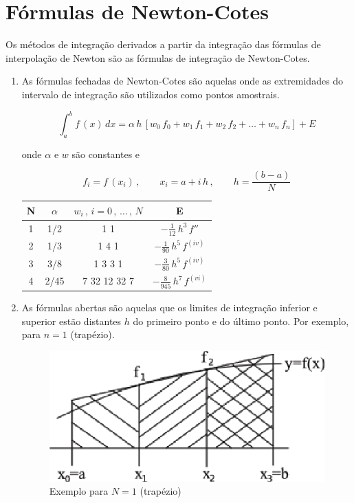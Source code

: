 \section{Fórmulas de Newton-Cotes}

Os métodos de integração derivados a partir da integração das fórmulas de interpolação de Newton são as fórmulas de integração de Newton-Cotes.

\begin{enumerate}
 \item

As fórmulas fechadas de Newton-Cotes são aquelas onde as extremidades do intervalo de integração são utilizados como pontos amostrais.

\[
 \int_a^b f\,(x) \, dx = \alpha \, h \, \left[ w_0\,f_0 + w_1\,f_1 + w_2\,f_2 + \ldots + w_n\,f_n \right] + E
\]

onde $\alpha$ e $w$ são constantes e

\[
 f_i = f\,(x_i)\,, \qquad x_i = a + i\,h\,, \qquad h = \frac{(b-a)}{N}
\]

{
\footnotesize
\begin{center}
\begin{tabular}{|c|c|c|c|}
	\hline		
	\textbf{N} & \textbf{$\alpha$} & \textbf{$w_i\,,\,i=0\,,\,\ldots\,,\,N$} & \textbf{E} \\
	\hline \hline
	1 & 1/2 & 1 1 & $- \displaystyle \frac{1}{12} \, h^3 \, f''$ \\
	\hline 
	2 & 1/3 & 1 4 1 & $- \displaystyle \frac{1}{90} \, h^5 \, f^{(iv)}$ \\
	\hline 
	3 & 3/8 & 1 3 3 1 & $- \displaystyle \frac{3}{80} \, h^5 \, f^{(iv)}$ \\
	\hline 
	4 & 2/45 & 7 32 12 32 7 & $- \displaystyle \frac{8}{945} \, h^7 \, f^{(vi)}$ \\
	\hline 
\end{tabular}
\end{center}
\label{cap2:sec5:tab1}
}

\item

As fórmulas abertas são aquelas que os limites de integração inferior e superior estão distantes $h$ do primeiro ponto e do último ponto. Por exemplo, para $n = 1$ (trapézio).

\begin{figure}[htb]
 \centering
 \includegraphics[scale=1.0]{capitulos/capitulo2/figuras/formula_newton_cotes1.eps}
 \caption{Exemplo para $N = 1$ (trapézio)}
 \label{fig:formula_newton_cotes1}
\end{figure}


\end{enumerate}
